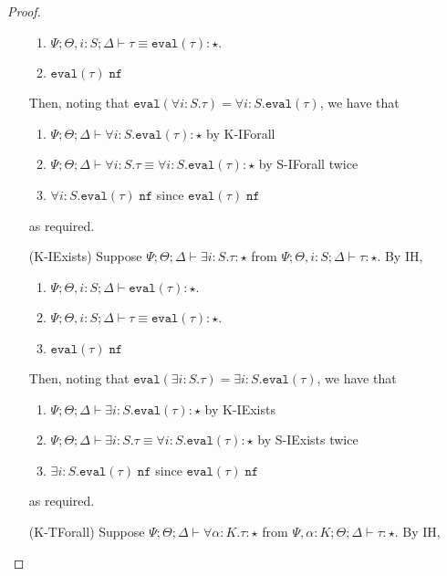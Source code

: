 \begin{proof}
\begin{enumerate}
\begin{enumerate}[1.]
   \item ${\Psi ; \Theta, i : S ; \Delta \vdash \tau \equiv \texttt{eval}(\tau) : \star}$.
   \item $\texttt{eval}(\tau) \; \texttt{nf}$
  \end{enumerate}
  Then, noting that $\texttt{eval}(\forall i : S. \tau) = \forall i : S.\texttt{eval}(\tau)$, we have that
  \begin{enumerate}[1.]
   \item ${\Psi ; \Theta ; \Delta \vdash \forall i : S. \texttt{eval}(\tau) : \star}$ by K-IForall
   \item ${\Psi ; \Theta ; \Delta \vdash \forall i : S.\tau \equiv \forall i : S. \texttt{eval}(\tau) : \star}$ by S-IForall twice
   \item $\forall i : S. \texttt{eval}(\tau) \; \texttt{nf}$ since $\texttt{eval}(\tau) \; \texttt{nf}$
  \end{enumerate}
  as required.
  \item[(K-IExists)] Suppose ${\Psi ; \Theta ; \Delta \vdash \exists i : S. \tau : \star}$ from ${\Psi ; \Theta, i : S ; \Delta \vdash \tau : \star}$.
  By IH,
  \begin{enumerate}[1.]
   \item ${\Psi ; \Theta, i : S ; \Delta \vdash \texttt{eval}(\tau) : \star}$.
   \item ${\Psi ; \Theta, i : S ; \Delta \vdash \tau \equiv \texttt{eval}(\tau) : \star}$.
   \item $\texttt{eval}(\tau) \; \texttt{nf}$
  \end{enumerate}
  Then, noting that $\texttt{eval}(\exists i : S. \tau) = \exists i : S.\texttt{eval}(\tau)$, we have that
  \begin{enumerate}[1.]
   \item ${\Psi ; \Theta ; \Delta \vdash \exists i : S. \texttt{eval}(\tau) : \star}$ by K-IExists
   \item ${\Psi ; \Theta ; \Delta \vdash \exists i : S.\tau \equiv \forall i : S. \texttt{eval}(\tau) : \star}$ by S-IExists twice
   \item $\exists i : S. \texttt{eval}(\tau) \; \texttt{nf}$ since $\texttt{eval}(\tau) \; \texttt{nf}$
  \end{enumerate}
  as required.
  \item[(K-TForall)] Suppose ${\Psi ; \Theta ; \Delta \vdash \forall \alpha : K. \tau : \star}$ from ${\Psi, \alpha : K; \Theta ; \Delta \vdash \tau : \star}$.
  By IH,
  \begin{enumerate}[1.]

\end{enumerate}
\end{enumerate}
\end{proof}
